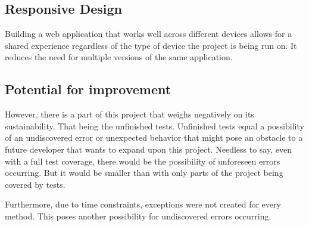 \subsection{Responsive Design}
Building a web application that works well across different devices allows for a shared experience regardless of the type of device the project is being run on. It reduces the need for multiple versions of the same application.

\subsection{Potential for improvement}
However, there is a part of this project that weighs negatively on its sustainability. That being the unfinished tests. Unfinished tests equal a possibility of an undiscovered error or unexpected behavior that might pose an obstacle to a future developer that wants to expand upon this project. Needless to say, even with a full test coverage, there would be the possibility of unforeseen errors occurring. But it would be smaller than with only parts of the project being covered by tests.

Furthermore, due to time constraints, exceptions were not created for every method. This poses another possibility for undiscovered errors occurring.

